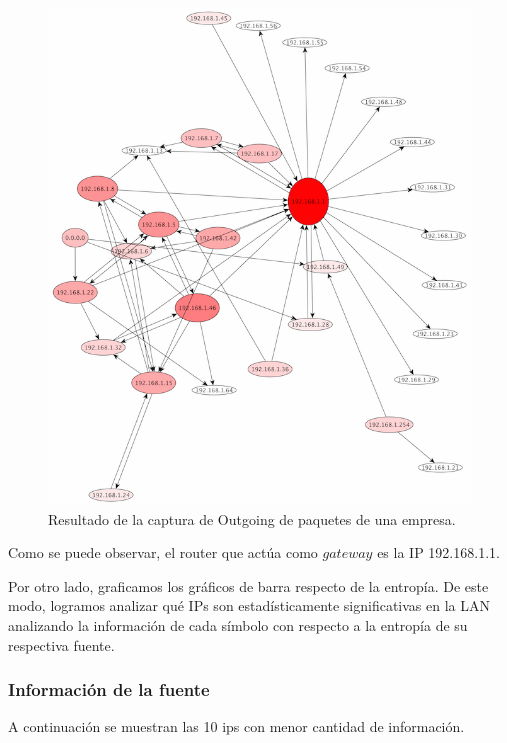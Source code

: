 \documentclass[10pt, a4paper]{article}
\begin{document}
\begin{figure}[H] %
\begin{center}
\includegraphics[width=400pt]{../imgs/tiarg-outgoing.png}
\caption{Resultado de la captura de Outgoing de paquetes de una empresa.}
\end{center}
\end{figure}

Como se puede observar, el router que actúa como $gateway$ es la IP 192.168.1.1.

Por otro lado, graficamos los gráficos de barra respecto de la entropía. De este modo, logramos analizar qué IPs son estadísticamente significativas en la LAN analizando la información de cada símbolo con respecto a la entropía de su respectiva fuente.

\subsubsection{Información de la fuente}

A continuaci\'on se muestran las 10 ips con menor cantidad de informaci\'on.
\end{document}
